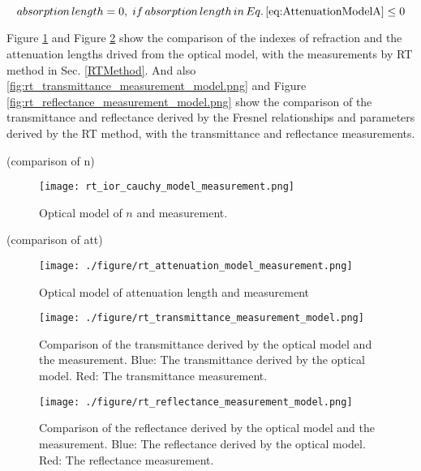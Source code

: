 \begin{equation}
\label{eq:AttenuationModelB}
absorption\,length = 0,\;if\,absorption\,length\,in\,Eq.\,\ref{eq:AttenuationModelA}\leq0
\end{equation}


Figure \ref{fig:rt_ior_cauchy_model_measurement.png} and Figure \ref{fig:rt_attenuation_model_measurement.png} show the comparison of the indexes of refraction and the attenuation lengths drived from the
optical model, with the measurements by RT method in Sec. \ref{RTMethod}.
And also \ref{fig:rt_transmittance_measurement_model.png} and Figure \ref{fig:rt_reflectance_measurement_model.png} show the comparison of the transmittance
and reflectance derived by the Fresnel relationships and parameters derived by the RT method, with the transmittance and reflectance measurements.




(comparison of n)
\begin{figure}
    \centering
    \texttt{[image: rt\_ior\_cauchy\_model\_measurement.png]}
    \caption[Optical model of $n$ and measurement]{Optical model of $n$ and measurement.}
    \label{fig:rt_ior_cauchy_model_measurement.png}
    \end{figure}



(comparison of att)
\begin{figure}
    \centering
    \texttt{[image: ./figure/rt\_attenuation\_model\_measurement.png]}
    \caption[Optical model of attenuation length and measurement]{Optical model of attenuation length and measurement}
    \label{fig:rt_attenuation_model_measurement.png}
    \end{figure}


\begin{figure}
    \centering
    \texttt{[image: ./figure/rt\_transmittance\_measurement\_model.png]}
    \caption[Comparison of the transmittance derived by the optical model and the measurement]
{
Comparison of the transmittance derived by the optical model and the measurement.
Blue: The transmittance derived by the optical model.
Red: The transmittance measurement.
}
    \label{fig:fig:rt_transmittance_measurement_model.png}
    \end{figure}


\begin{figure}
    \centering
    \texttt{[image: ./figure/rt\_reflectance\_measurement\_model.png]}
    \caption[Comparison of the reflectance derived by the optical model and the measurement.]
{
Comparison of the reflectance derived by the optical model and the measurement.
Blue: The reflectance derived by the optical model.
Red: The reflectance measurement.
}
    \label{}
    \end{figure}



